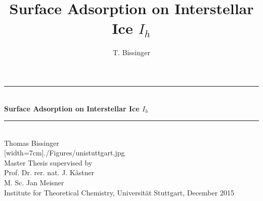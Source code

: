 \documentclass[8.5pt,twoside,twocolumn]{article}
\title{Surface Adsorption on Interstellar Ice $I_h$}
\author{T. Bissinger}
\theoremstyle{standard}
\begin{document}
\begin{titlepage}

\begin{center}


 


\newcommand{\HRule}{\rule{\linewidth}{0.5mm}}

\HRule \\[0.4cm]

{ \huge \bfseries Surface Adsorption on Interstellar Ice $I_h$}


\HRule \\[2cm]

{\LARGE Thomas Bissinger}\\[4cm]

\vfill 
[width=7cm]{./Figures/unistuttgart.jpg}\\[2cm]   

{\Large Master Thesis supervised by \\[.7cm]
Prof. Dr. rer. nat. J. Kästner \\[.4cm]
M. Sc. Jan Meisner}\\[.4cm]


{ \Large  Institute for Theoretical Chemistry, Universität Stuttgart, December 2015}




\end{center}


\end{titlepage}
\newpage
\newpage
\clearpage



{}
\end{document}
